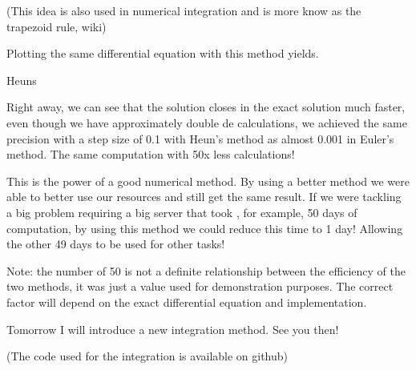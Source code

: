 (This idea is also used in numerical integration and is more know as the trapezoid rule, wiki)

Plotting the same differential equation with this method yields.

Heuns

Right away, we can see that the solution closes in the exact solution much faster, even though we have approximately double de calculations, we achieved the same precision with a step size of 0.1 with Heun's method as almost 0.001 in Euler's method. The same computation with 50x less calculations!

This is the power of a good numerical method. By using a better method we were able to better use our resources and still get the same result. If we were tackling a big problem requiring a big server that took , for example, 50 days of computation, by using this method we could reduce this time to 1 day! Allowing the other 49 days to be used for other tasks!

Note: the number of 50 is not a definite relationship between the efficiency of the two methods, it was just a value used for demonstration purposes. The correct factor will depend on the exact differential equation and implementation.

Tomorrow I will introduce a new integration method. See you then!

(The code used for the integration is available on github)
